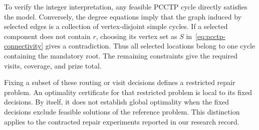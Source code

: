 To verify the integer interpretation, any feasible PCCTP cycle directly
satisfies the model. Conversely, the degree equations imply that the graph
induced by selected edges is a collection of vertex-disjoint simple cycles.
If a selected component does not contain $r$, choosing its vertex set as
$S$ in~\eqref{eq:pcctp-connectivity} gives a contradiction. Thus all selected
locations belong to one cycle containing the mandatory root. The remaining
constraints give the required visits, coverage, and prize total.

Fixing a subset of these routing or visit decisions defines a restricted
repair problem. An optimality certificate for that restricted problem is
local to its fixed decisions. By itself, it does not establish global optimality when the fixed decisions
exclude feasible solutions of the reference problem.
This distinction applies to the contracted repair experiments reported in
our research record.
